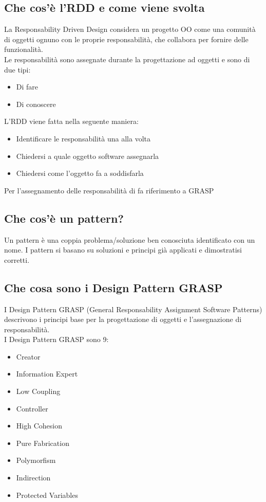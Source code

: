 \documentclass[12pt, a4paper, openany]{book}
\begin{document}
\subsection*{Che cos'è l'RDD e come viene svolta}
La Responsability Driven Design considera un progetto OO come una comunità di oggetti
ognuno con le proprie responsabilità, che collabora per fornire delle funzionalità.\\
Le responsabilità sono assegnate durante la progettazione ad oggetti e sono di due tipi:
\begin{itemize}
    \item Di fare
    \item Di conoscere
\end{itemize}
L'RDD viene fatta nella seguente maniera:
\begin{itemize}
    \item Identificare le responsabilità una alla volta
    \item Chiedersi a quale oggetto software assegnarla
    \item Chiedersi come l'oggetto fa a soddisfarla
\end{itemize}
Per l'assegnamento delle responsabilità di fa riferimento a GRASP

\subsection*{Che cos'è un pattern?}
Un pattern è una coppia problema/soluzione ben conosciuta identificato
con un nome. I pattern si basano su soluzioni e principi già applicati e dimostratisi corretti.

\subsection*{Che cosa sono i Design Pattern GRASP}
I Design Pattern GRASP (General Responsability Assignment Software Patterns) descrivono
i principi base per la progettazione di oggetti e l'assegnazione di responsabilità.\\
I Design Pattern GRASP sono 9:
\begin{itemize}
    \item Creator
    \item Information Expert
    \item Low Coupling
    \item Controller
    \item High Cohesion
    \item Pure Fabrication
    \item Polymorfism
    \item Indirection
    \item Protected Variables
\end{itemize} 
\end{document}
